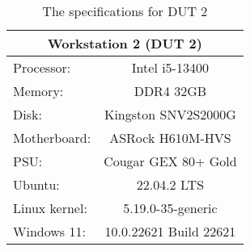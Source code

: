 \begin{table}[H]
    \centering
    \begin{tabular}{|| l | c ||}
    \hline
    \multicolumn{2}{||c||}{Workstation 2 (DUT 2)}           \\ [0.5ex] \hline\hline
    Processor:          & Intel i5-13400 \\
    Memory:             & DDR4 32GB    \\
    Disk:               & Kingston SNV2S2000G \\
    Motherboard:        & ASRock H610M-HVS      \\
    PSU:                & Cougar GEX 80+ Gold \\
    Ubuntu:             & 22.04.2 LTS        \\
    Linux kernel:       & 5.19.0-35-generic       \\
    Windows 11:         & 10.0.22621 Build 22621 \\ \hline
    \end{tabular}
    \caption{The specifications for DUT 2}
    \label{tab:DUT2}
\end{table}
